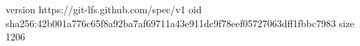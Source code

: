 version https://git-lfs.github.com/spec/v1
oid sha256:42b001a776c65f8a92ba7af69711a43e911dc9f78eef05727063dff1fbbc7983
size 1206
